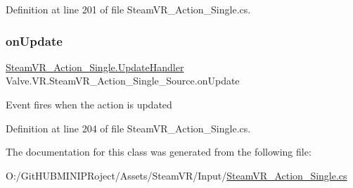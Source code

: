 Definition at line 201 of file Steam\+V\+R\+\_\+\+Action\+\_\+\+Single.\+cs.

\mbox{\label{class_valve_1_1_v_r_1_1_steam_v_r___action___single___source_aa5599e6469b2131d46da56da592530bd}} 
\subsubsection{\texorpdfstring{onUpdate}{onUpdate}}
{\footnotesize\ttfamily \mbox{\hyperlink{class_valve_1_1_v_r_1_1_steam_v_r___action___single_a1514666eabcafba498274e8d6cee2a40}{Steam\+V\+R\+\_\+\+Action\+\_\+\+Single.\+Update\+Handler}} Valve.\+V\+R.\+Steam\+V\+R\+\_\+\+Action\+\_\+\+Single\+\_\+\+Source.\+on\+Update}



Event fires when the action is updated 



Definition at line 204 of file Steam\+V\+R\+\_\+\+Action\+\_\+\+Single.\+cs.



The documentation for this class was generated from the following file\+:\begin{DoxyCompactItemize}
\item 
O\+:/\+Git\+H\+U\+B\+M\+I\+N\+I\+P\+Roject/\+Assets/\+Steam\+V\+R/\+Input/\mbox{\hyperlink{_steam_v_r___action___single_8cs}{Steam\+V\+R\+\_\+\+Action\+\_\+\+Single.\+cs}}\end{DoxyCompactItemize}

